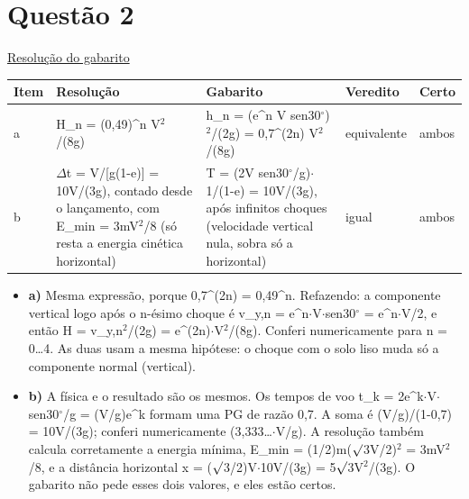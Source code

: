 \documentclass{article}%
\begin{document}
\section*{Questão 2}%
\href{https://poliedroresolve.sistemapoliedro.com.br/vestibulares/ita/2027/ita-2-fase-dia-3-22-10-2026-2-fase-dia-3/dissertativa-2-fisica-2-fase-dia-3-ita-2027}{Resolução do gabarito}\par\smallskip%
\begin{longtable}{@{}p{} p{} p{} p{} p{}@{}}\toprule Item & Resolução & Gabarito & Veredito & Certo \\ \midrule
a & H\_n = (0,49)\^{}n V$^2$/(8g) & h\_n = (e\^{}n V sen30$^\circ$)$^2$/(2g) = 0,7\^{}(2n) V$^2$/(8g) & equivalente & ambos \\
b & $\Delta$t = V/{[}g(1-e){]} = 10V/(3g), contado desde o lançamento, com E\_min = 3mV$^2$/8 (só resta a energia cinética horizontal) & T = (2V sen30$^\circ$/g)$\cdot$1/(1-e) = 10V/(3g), após infinitos choques (velocidade vertical nula, sobra só a horizontal) & igual & ambos \\
\bottomrule\end{longtable}%
\begin{itemize}%
\item%
\textbf{a)} Mesma expressão, porque 0,7\^{}(2n) = 0,49\^{}n. Refazendo: a componente vertical logo após o n{-}ésimo choque é v\_y,n = e\^{}n$\cdot$V$\cdot$sen30$^\circ$ = e\^{}n$\cdot$V/2, e então H = v\_y,n$^2$/(2g) = e\^{}(2n)$\cdot$V$^2$/(8g). Conferi numericamente para n = 0\ldots{}4. As duas usam a mesma hipótese: o choque com o solo liso muda só a componente normal (vertical).%
\item%
\textbf{b)} A física e o resultado são os mesmos. Os tempos de voo t\_k = 2e\^{}k$\cdot$V$\cdot$sen30$^\circ$/g = (V/g)e\^{}k formam uma PG de razão 0,7. A soma é (V/g)/(1-0,7) = 10V/(3g); conferi numericamente (3,333\ldots{}$\cdot$V/g). A resolução também calcula corretamente a energia mínima, E\_min = (1/2)m($\surd$3V/2)$^2$ = 3mV$^2$/8, e a distância horizontal x = ($\surd$3/2)V$\cdot$10V/(3g) = 5$\surd$3V$^2$/(3g). O gabarito não pede esses dois valores, e eles estão certos.%
\end{itemize}%
\end{document}
